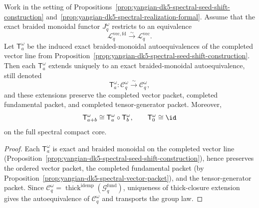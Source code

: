 \begin{proposition}
\label{prop:yangian-dk5-spectral-core-shifts}
Work in the setting of
Propositions~\ref{prop:yangian-dk5-spectral-seed-shift-construction}
and~\ref{prop:yangian-dk5-spectral-realization-formal}.  Assume that
the exact braided monoidal functor \(J_q^\omega\) restricts to an
equivalence
\[
\mathcal{L}^{\mathrm{vec,fd}}_{q}\xrightarrow{\sim}
\mathcal{L}^{\mathrm{vec}}_{q}.
\]
Let \(\mathsf{T}^{\omega}_a\) be the induced exact braided-monoidal
autoequivalences of the completed vector line from
Proposition~\ref{prop:yangian-dk5-spectral-seed-shift-construction}.
Then each \(\mathsf{T}^{\omega}_a\) extends uniquely to an exact
braided-monoidal autoequivalence, still denoted
\[
\mathsf{T}^{\omega}_a\colon
\mathcal{C}_q^\omega\xrightarrow{\sim}\mathcal{C}_q^\omega,
\]
and these extensions preserve the completed vector packet, completed
fundamental packet, and completed tensor-generator packet.  Moreover,
\[
\mathsf{T}^{\omega}_{a+b}\cong
\mathsf{T}^{\omega}_a\circ \mathsf{T}^{\omega}_b,
\qquad
\mathsf{T}^{\omega}_0\cong \id
\]
on the full spectral compact core.
\end{proposition}

\begin{proof}
Each \(\mathsf{T}^{\omega}_a\) is exact and braided monoidal on the
completed vector line
(Proposition~\ref{prop:yangian-dk5-spectral-seed-shift-construction}),
hence preserves the ordered vector packet, the completed fundamental
packet (by
Proposition~\ref{prop:yangian-dk5-spectral-vector-packet}), and the
tensor-generator packet.  Since
\(\mathcal{C}_q^\omega=
\operatorname{thick}^{\mathrm{idemp}}(\mathcal{G}^{\mathrm{fund}}_{q})\),
uniqueness of thick-closure extension gives the autoequivalence of
\(\mathcal{C}_q^\omega\) and transports the group law.
\end{proof}

